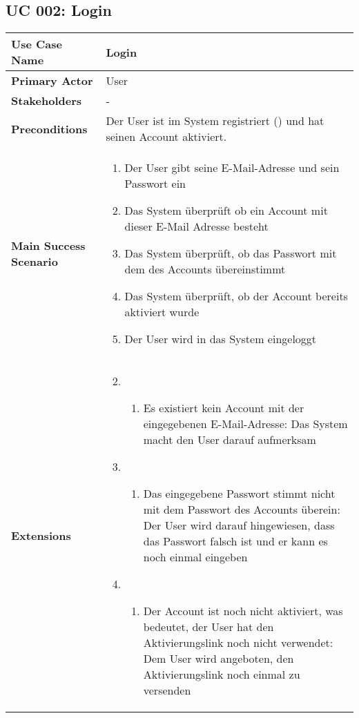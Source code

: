 \subsection{UC 002: Login}
\label{uc:002-login}

\begin{tabular}{|l|p{}|}
\hline
\textbf{Use Case Name} 	&	Login	\\ \hline
\textbf{Primary Actor} 	&	User	\\ \hline
\textbf{Stakeholders}	&	-	\\ \hline
\textbf{Preconditions}	&	Der User ist im System registriert (\nameref{uc:001-register}) und hat seinen Account aktiviert.	\\ \hline
\textbf{Main Success Scenario}	& 	
\begin{enumerate}
	\item Der User gibt seine E-Mail-Adresse und sein Passwort ein
	\item Das System überprüft ob ein Account mit dieser E-Mail Adresse besteht
	\item Das System überprüft, ob das Passwort mit dem des Accounts übereinstimmt
	\item Das System überprüft, ob der Account bereits aktiviert wurde
	\item Der User wird in das System eingeloggt
\end{enumerate}
\\ \hline
\textbf{Extensions}	& 	
\begin{enumerate}
\setcounter{enumi}{1}
\item 
\begin{enumerate}
\item Es existiert kein Account mit der eingegebenen E-Mail-Adresse: Das System macht den User darauf aufmerksam
\end{enumerate}
\item
\begin{enumerate}
\item Das eingegebene Passwort stimmt nicht mit dem Passwort des Accounts überein: Der User wird darauf hingewiesen, dass das Passwort falsch ist und er kann es noch einmal eingeben
\end{enumerate}
\item
\begin{enumerate}
\item Der Account ist noch nicht aktiviert, was bedeutet, der User hat den Aktivierungslink noch nicht verwendet: Dem User wird angeboten, den Aktivierungslink noch einmal zu versenden
\end{enumerate}
\end{enumerate}
\\ \hline
\end{tabular}